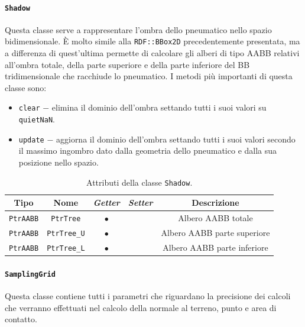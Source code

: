 \paragraph{\texttt{Shadow}}
Questa classe serve a rappresentare l'ombra dello pneumatico nello spazio bidimensionale. È molto simile alla \texttt{RDF::BBox2D} precedentemente presentata, ma a differenza di quest'ultima permette di calcolare gli alberi di tipo \ac{AABB} relativi all'ombra totale, della parte superiore e della parte inferiore del \ac{BB} tridimensionale che racchiude lo pneumatico. I metodi più importanti di questa classe sono:
\begin{itemize}
	\item \texttt{clear} $-$ elimina il dominio dell'ombra settando tutti i suoi valori su \texttt{quietNaN}.
	\item \texttt{update} $-$ aggiorna il dominio dell'ombra settando tutti i suoi valori secondo il massimo ingombro dato dalla geometria dello pneumatico e dalla sua posizione nello spazio.
\end{itemize}
\begin{table}[h!]
	\centering
	\begin{tabular}{|c|c|c|c|c|}
		\hline 
		\textbf{Tipo} & \textbf{Nome} & \textit{\textbf{Getter}} & \textit{\textbf{Setter}} & \textbf{Descrizione} \\ \hline 
		\texttt{PtrAABB} & \texttt{PtrTree} & $\bullet$ & & Albero \ac{AABB} totale\\ \hline
		\texttt{PtrAABB} & \texttt{PtrTree\_U} & $\bullet$ & & Albero \ac{AABB} parte superiore \\ \hline
		\texttt{PtrAABB} & \texttt{PtrTree\_L} & $\bullet$ & & Albero \ac{AABB} parte inferiore \\ \hline
	\end{tabular}
	\caption{Attributi della classe \texttt{Shadow}.}
	\label{}
\end{table}
%
\paragraph{\texttt{SamplingGrid}}
Questa classe contiene tutti i parametri che riguardano la precisione dei calcoli che verranno effettuati nel calcolo della normale al terreno, punto e area di contatto.

